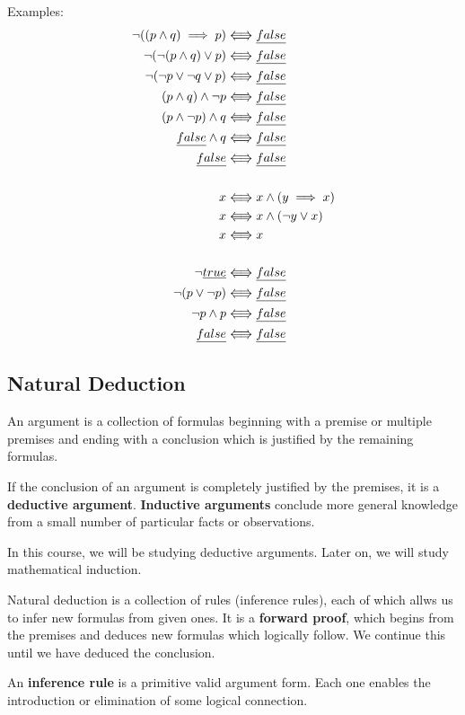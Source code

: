 \documentclass[12pt]{article}
\newcommand{\trans}{\ensuremath{\Lleftarrow\!\Rrightarrow}}
\begin{document}
Examples:
\begin{align*}
\neg ( ( p \land q ) \implies p ) &\trans \emph{false}\\
\neg ( \neg ( p \land q ) \lor p ) &\trans \emph{false}\\
\neg ( \neg p \lor \neg q \lor p ) &\trans \emph{false}\\
(p \land q) \land \neg p &\trans \emph{false}\\
(p \land \neg p) \land q &\trans \emph{false}\\
\emph{false} \land q &\trans \emph{false}\\
\emph{false} &\trans \emph{false}\\\\
x &\trans x \land (y \implies x)\\
x &\trans x \land ( \neg y \lor x)\\
x &\trans x\\\\
\neg \emph{true} &\trans \emph{false}\\
\neg (p \lor \neg p) &\trans \emph{false}\\
\neg p \land p &\trans \emph{false}\\
\emph{false} &\trans \emph{false}\\
\end{align*}

\subsection*{Natural Deduction}
An argument is a collection of formulas beginning with a premise or multiple premises and ending with a conclusion which is justified by the remaining formulas.

If the conclusion of an argument is completely justified by the premises, it is a {\bf deductive argument}. {\bf Inductive arguments} conclude more general knowledge from a small number of particular facts or observations.

In this course, we will be studying deductive arguments. Later on, we will study mathematical induction.

Natural deduction is a collection of rules (inference rules), each of which allws us to infer new formulas from given ones. It is a {\bf forward proof}, which begins from the premises and deduces new formulas which logically follow. We continue this until we have deduced the conclusion.

An {\bf inference rule} is a primitive valid argument form. Each one enables the introduction or elimination of some logical connection.
\end{document}
